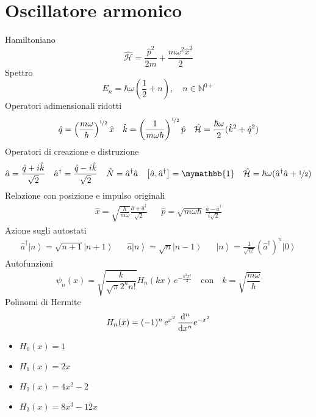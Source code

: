 \documentclass{article}
\newcommand{\deh}{\mathrm{d}}
\newcommand{\ham}{\hat{\mathcal{H}}}
\newcommand{\dsone}{\mymathbb{1}}
\newcommand{\onehalf}{\nicefrac{1}{2}}
\newcommand{\ket}[1]{\left| #1 \right\rangle}
\newcommand{\der}[2][1]{\if 1#1 \frac{\deh}{\deh #2} \else \frac{\deh^#1}{\deh #2^#1} \fi}
\newcommand{\comm}[2]{\left[#1,#2\right]}
\begin{document}
\section{Oscillatore armonico}
Hamiltoniano
\[ \ham = \frac{\hat{p}^2}{2m} + \frac{m\omega^2 \hat{x}^2}{2} \]
Spettro
\[ E_n=\hbar\omega\left(\frac{1}{2}+n\right),\quad n \in \mathbb{N}^{0+} \]
Operatori adimensionali ridotti
\begin{align*}
    \hat{q}=\left(\frac{m\omega}{\hbar}\right)^{\onehalf}\hat{x} && \hat{k}=\left(\frac{1}{m\omega\hbar}\right)^{\onehalf} \hat{p} && \ham = \frac{\hbar\omega}{2}(\hat{k}^2+\hat{q}^2)
\end{align*}
Operatori di creazione e distruzione
\begin{align*}
    \hat{a}=\frac{\hat{q}+i\hat{k}}{\sqrt{2}} && \hat{a}^\dagger=\frac{\hat{q}-i\hat{k}}{\sqrt{2}} && \hat{N}=\hat{a}^\dagger \hat{a} && \comm{\hat{a}}{\hat{a}^\dagger}=\dsone && \ham = \hbar\omega(\hat{a}^\dagger\hat{a}+\nicefrac{1}{2})
\end{align*}
Relazione con posizione e impulso originali
\begin{align*}
    \hat{x}=\sqrt{\frac{\hbar}{m\omega}}\frac{\hat{a}+\hat{a}^\dagger}{\sqrt{2}} && \hat{p}=\sqrt{m\omega\hbar}\,\frac{\hat{a}-\hat{a}^\dagger}{i\sqrt{2}}
\end{align*}
Azione sugli autostati
\begin{align*}
\hat{a}^\dagger\ket{n}=\sqrt{n+1}\ket{n+1} && \hat{a}\ket{n}=\sqrt{n}\ket{n-1} && \ket{n}=\frac{1}{\sqrt{n!}}\left(\hat{a}^\dagger\right)^n\ket{0}
\end{align*}
Autofunzioni
\[\psi_n(x)=\sqrt{\frac{k}{\sqrt{\pi}2^n n!}}H_n(kx)\,e^{-\frac{k^2x^2}{2}}\quad\mathrm{con}\quad k=\sqrt{\frac{m\omega}{\hbar}}\]
Polinomi di Hermite
\[H_n(x)=(-1)^n \, e^{x^2}\,\der[n]{x}e^{-x^2}\]
\begin{itemize}
    \item[] $H_0(x)=1$
    \item[] $H_1(x)=2x$
    \item[] $H_2(x)=4x^2-2$
    \item[] $H_3(x)=8x^3-12x$
\end{itemize}
\end{document}
